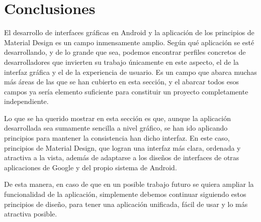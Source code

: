 \section{Conclusiones}

El desarrollo de interfaces gráficas en Android y la aplicación de los principios de Material Design es un campo inmensamente amplio. Según qué aplicación se esté desarrollando, y de lo grande que sea, podemos encontrar perfiles concretos de desarrolladores que invierten su trabajo únicamente en este aspecto, el de la interfaz gráfica y el de la experiencia de usuario. Es un campo que abarca muchas más áreas de las que se han cubierto en esta sección, y el abarcar todos esos campos ya sería elemento suficiente para constituir un proyecto completamente independiente.

Lo que se ha querido mostrar en esta sección es que, aunque la aplicación desarrollada sea sumamente sencilla a nivel gráfico, se han ido aplicando principios para mantener la consistencia han dicho interfaz. En este caso, principios de Material Design, que logran una interfaz más clara, ordenada y atractiva a la vista, además de adaptarse a los diseños de interfaces de otras aplicaciones de Google y del propio sistema de Android.

De esta manera, en caso de que en un posible trabajo futuro se quiera ampliar la funcionalidad de la aplicación, simplemente debemos continuar siguiendo estos principios de diseño, para tener una aplicación unificada, fácil de usar y lo más atractiva posible.

